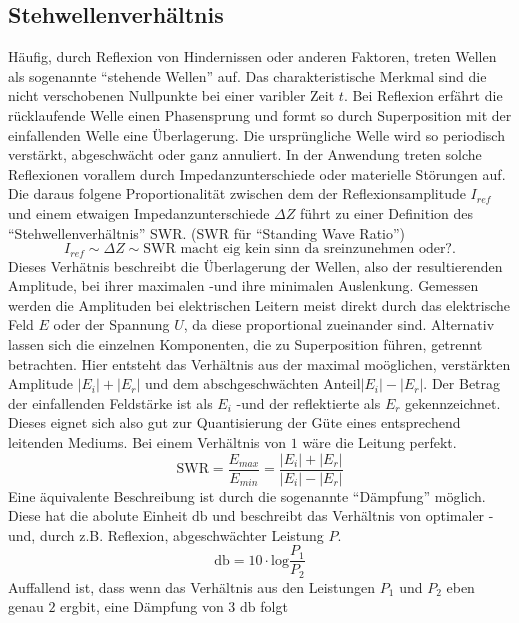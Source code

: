 \subsection{Stehwellenverhältnis} 
Häufig, durch Reflexion von Hindernissen oder anderen Faktoren, treten Wellen als sogenannte \enquote{stehende Wellen} auf. Das charakteristische Merkmal sind die nicht verschobenen Nullpunkte bei einer varibler Zeit $t$.
Bei Reflexion erfährt die rücklaufende Welle einen Phasensprung und formt so durch Superposition mit der einfallenden Welle eine Überlagerung. Die ursprüngliche Welle wird so periodisch verstärkt, abgeschwächt oder ganz annuliert. 
In der Anwendung treten solche Reflexionen vorallem durch Impedanzunterschiede oder materielle Störungen auf. Die daraus folgene Proportionalität zwischen dem der Reflexionsamplitude $I_{ref}$ und einem etwaigen Impedanzunterschiede $\Delta Z$
führt zu einer Definition des \enquote{Stehwellenverhältnis} SWR. (SWR für \enquote{Standing Wave Ratio}) 
\begin{equation*}
    I_{ref} \sim \Delta Z \sim \text{SWR macht eig kein sinn da sreinzunehmen oder?}.
\end{equation*}
Dieses Verhätnis beschreibt die Überlagerung der Wellen, also der resultierenden Amplitude, bei ihrer maximalen -und ihre minimalen Auslenkung. 
Gemessen werden die Amplituden bei elektrischen Leitern meist direkt durch das elektrische Feld $E$ oder der Spannung $U$, da diese proportional zueinander sind.
Alternativ lassen sich die einzelnen Komponenten, die zu Superposition führen, getrennt betrachten. Hier entsteht das Verhältnis aus der maximal moöglichen, verstärkten Amplitude $|E_i| + |E_r|$ und dem abschgeschwächten Anteil$|E_i| - |E_r|$.
Der Betrag der einfallenden Feldstärke ist als $E_i$ -und der reflektierte als $E_r$ gekennzeichnet. Dieses eignet sich also gut zur Quantisierung der Güte eines entsprechend leitenden Mediums. Bei einem Verhältnis von $1$ wäre die Leitung perfekt.
\begin{equation}
    \text{SWR} = \frac{E_{max}}{E_{min}} =  \frac{|E_i| + |E_r|}{|E_i| - |E_r|}
\end{equation}
Eine äquivalente Beschreibung ist durch die sogenannte \enquote{Dämpfung} möglich. Diese hat die abolute Einheit $\si{\decibel}$ und beschreibt das Verhältnis von optimaler -und, durch z.B. Reflexion, abgeschwächter Leistung $P$. 
\begin{equation}
    \si{\decibel} = 10 \cdot \text{log} \frac{P_1}{P_2}
\end{equation}
Auffallend ist, dass wenn das Verhältnis aus den Leistungen $P_1$ und $P_2$ eben genau $2$ ergbit, eine Dämpfung von 3 $\si{\decibel}$ folgt
